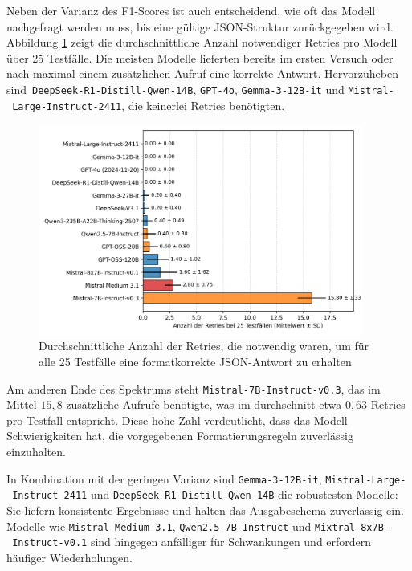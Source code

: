Neben der Varianz des F1-Scores ist auch entscheidend, wie oft das Modell nachgefragt werden muss, bis eine gültige JSON-Struktur zurückgegeben wird. Abbildung \ref{fig:results_evaluation_amount_of_retries} zeigt die durchschnittliche Anzahl notwendiger Retries pro Modell über 25 Testfälle. Die meisten Modelle lieferten bereits im ersten Versuch oder nach maximal einem zusätzlichen Aufruf eine korrekte Antwort. Hervorzuheben sind\linebreak~\texttt{DeepSeek-R1-Distill-Qwen-14B}, \texttt{GPT-4o}, \texttt{Gemma-3-12B-it} und \texttt{Mistral-\linebreak~Large-Instruct-2411}, die keinerlei Retries benötigten.

\begin{figure}[htbp]
    \centering
    \includegraphics[width=0.95\textwidth]{images/results/evaluation_amount_of_retries_}
    \caption{Durchschnittliche Anzahl der Retries, die notwendig waren, um für alle 25 Testfälle eine formatkorrekte JSON-Antwort zu erhalten}
    \label{fig:results_evaluation_amount_of_retries}
\end{figure}

Am anderen Ende des Spektrums steht \texttt{Mistral-7B-Instruct-v0.3}, das im Mittel $15{,}8$ zusätzliche Aufrufe benötigte, was im durchschnitt etwa $0{,}63$ Retries pro Testfall entspricht. Diese hohe Zahl verdeutlicht, dass das Modell Schwierigkeiten hat, die vorgegebenen Formatierungsregeln zuverlässig einzuhalten.

In Kombination mit der geringen Varianz sind \texttt{Gemma-3-12B-it}, \texttt{Mistral-Large-\linebreak~Instruct-2411} und \texttt{DeepSeek-R1-Distill-Qwen-14B} die robustesten Modelle: Sie liefern konsistente Ergebnisse und halten das Ausgabeschema zuverlässig ein. Modelle wie \texttt{Mistral Medium 3.1}, \texttt{Qwen2.5-7B-Instruct} und \texttt{Mixtral-8x7B-\linebreak~Instruct-v0.1} sind hingegen anfälliger für Schwankungen und erfordern häufiger Wiederholungen.